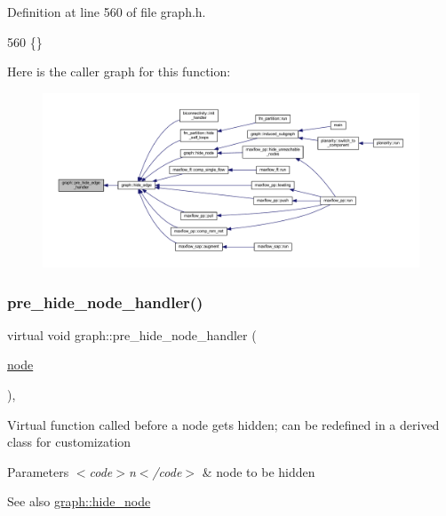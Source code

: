 Definition at line 560 of file graph.\+h.


\begin{DoxyCode}
560 \{\}          
\end{DoxyCode}
Here is the caller graph for this function\+:
\nopagebreak
\begin{figure}[H]
\begin{center}
\leavevmode
\includegraphics[width=350pt]{classgraph_aa33201befa6ad7433becd7424d6de55b_icgraph}
\end{center}
\end{figure}
\mbox{\label{classgraph_ac169b1dca0b01c97e683302b3908fd49}} 
\subsubsection{\texorpdfstring{pre\+\_\+hide\+\_\+node\+\_\+handler()}{pre\_hide\_node\_handler()}}
{\footnotesize\ttfamily virtual void graph\+::pre\+\_\+hide\+\_\+node\+\_\+handler (\begin{DoxyParamCaption}\item[{\mbox{\hyperlink{classnode}{node}}}]{ }\end{DoxyParamCaption})\hspace{0.3cm}{\ttfamily [inline]}, {\ttfamily [virtual]}}

Virtual function called before a node gets hidden; can be redefined in a derived class for customization


\begin{DoxyParams}{Parameters}
{\em $<$code$>$n$<$/code$>$} & node to be hidden \\
\hline
\end{DoxyParams}
\begin{DoxySeeAlso}{See also}
\mbox{\hyperlink{classgraph_a214618b5e3c02695779350532506e225}{graph\+::hide\+\_\+node}} 
\end{DoxySeeAlso}


